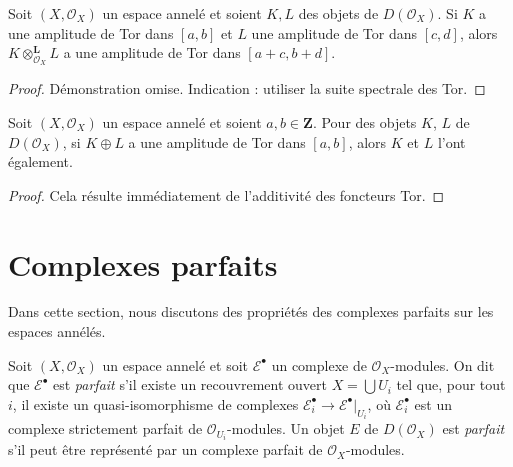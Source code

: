 \begin{lemma}

\label{lemma-tensor-tor-amplitude}
Soit $(X, \mathcal{O}_X)$ un espace annelé et soient $K, L$ des objets de $D(\mathcal{O}_X)$. Si $K$ a une amplitude de Tor dans $[a, b]$ et $L$ une amplitude de Tor dans $[c, d]$, alors $K \otimes_{\mathcal{O}_X}^\mathbf{L} L$ a une amplitude de Tor dans $[a + c, b + d]$.
\end{lemma}

\begin{proof}

Démonstration omise. Indication : utiliser la suite spectrale des Tor.

\end{proof}

\begin{lemma}

\label{lemma-summands-tor-amplitude}
Soit $(X, \mathcal{O}_X)$ un espace annelé et soient $a, b \in \mathbf{Z}$. Pour des objets $K$, $L$ de $D(\mathcal{O}_X)$, si $K \oplus L$ a une amplitude de Tor dans $[a, b]$, alors $K$ et $L$ l'ont également.
\end{lemma}

\begin{proof}

Cela résulte immédiatement de l'additivité des foncteurs Tor.

\end{proof}





\section{Complexes parfaits}

\label{section-perfect}

\noindent
Dans cette section, nous discutons des propriétés des complexes parfaits sur les espaces annélés.

\begin{definition}

\label{definition-perfect}
Soit $(X, \mathcal{O}_X)$ un espace annelé et soit $\mathcal{E}^\bullet$ un complexe de $\mathcal{O}_X$-modules. On dit que $\mathcal{E}^\bullet$ est {\it parfait} s'il existe un recouvrement ouvert $X = \bigcup U_i$ tel que, pour tout $i$, il existe un quasi-isomorphisme de complexes $\mathcal{E}_i^\bullet \to \mathcal{E}^\bullet|_{U_i}$, où $\mathcal{E}_i^\bullet$ est un complexe strictement parfait de $\mathcal{O}_{U_i}$-modules. Un objet $E$ de $D(\mathcal{O}_X)$ est {\it parfait} s'il peut être représenté par un complexe parfait de $\mathcal{O}_X$-modules.
\end{definition}

